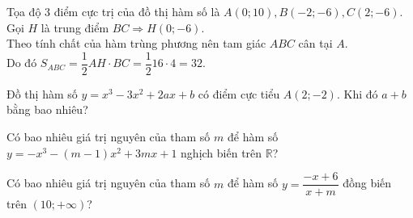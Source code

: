 \begin{ex}
\begin{ex}
{ Tọa độ $ 3 $ điểm cực trị của đồ thị hàm số là $ A(0;10), B(-2;-6), C(2;-6)$.\\
 Gọi $ H $ là trung điểm $ BC \Rightarrow H(0;-6)$.\\
 Theo tính chất của hàm trùng phương nên tam giác $ ABC $ cân tại $ A .$\\
 Do đó $ S_{ABC}=\dfrac{1}{2}AH\cdot BC =\dfrac{1}{2}16\cdot 4=32. $
 }
\end{ex}
\begin{ex}%
 Đồ thị hàm số $y=x^3-3x^2+2ax+b$ có điểm cực tiểu $A(2;-2)$. Khi đó $a+b$ bằng bao nhiêu?
\end{ex}
\begin{ex}
 Có bao nhiêu giá trị nguyên của tham số $m$ để hàm số $y=-x^3-(m-1)x^2+3mx+1$ nghịch biến trên $\mathbb{R}$?
\end{ex}
\begin{ex}
 Có bao nhiêu giá trị nguyên của tham số $m$ để hàm số $y=\dfrac{-x+6}{x+m}$ đồng biến trên $(10;+\infty)$?
\end{ex}
\end{ex}
